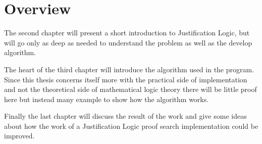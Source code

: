\section{Overview}
The second chapter will present a short introduction to Justification Logic, but will go only as deep as needed to understand the problem as well as the develop algorithm.
\par
The heart of the third chapter will introduce the algorithm used in the program. Since this thesis concerns itself more with the practical side of implementation and not the theoretical side of mathematical logic theory there will be little proof here but instead many example to show how the algorithm works.
\par
Finally the last chapter will discuss the result of the work and give some ideas about how the work of a Justification Logic proof search implementation could be improved. 